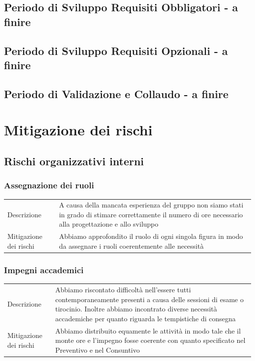 \documentclass{article}
\begin{document}
\subsection{Periodo di Sviluppo Requisiti Obbligatori - a finire}
\subsection{Periodo di Sviluppo Requisiti Opzionali - a finire}
\subsection{Periodo di Validazione e Collaudo - a finire}

\newpage
\section{Mitigazione dei rischi}

\subsection{Rischi organizzativi interni}

\subsubsection{Assegnazione dei ruoli}
\begin{center}
\begin{tabular}{P{10em} P{20em}} 
     Descrizione &  A causa della mancata esperienza del gruppo non siamo stati in grado di stimare correttamente il numero di ore necessario alla progettazione e allo sviluppo\\ 
    Mitigazione dei rischi &  Abbiamo approfondito il ruolo di ogni singola figura in modo da assegnare i ruoli coerentemente alle necessità\\
\end{tabular}
\label{tab:mitruoli}
\end{center}

\subsubsection{Impegni accademici}
\begin{center}
\begin{tabular}{P{10em} P{20em}} 
     Descrizione & Abbiamo riscontato difficoltà nell'essere tutti contemporaneamente presenti a causa delle sessioni di esame o tirocinio. Inoltre abbiamo incontrato diverse necessità accademiche per quanto riguarda le tempistiche di consegna \\ 
    Mitigazione dei rischi & Abbiamo distribuito equamente le attività in modo tale che il monte ore e l'impegno fosse coerente con quanto specificato nel Preventivo e nel Consuntivo  \\
\end{tabular}
\label{tab:mitimpegni}
\end{center}
\end{document}
